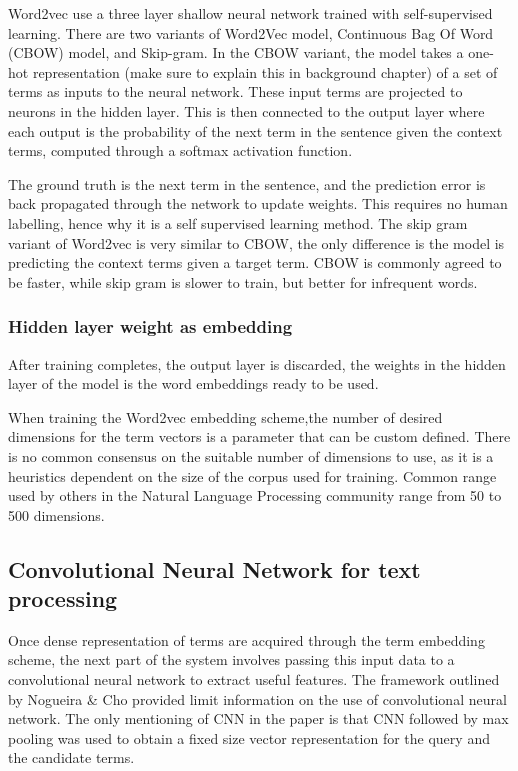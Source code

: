 Word2vec use a three layer shallow neural network trained with self-supervised learning. There are two variants of Word2Vec model, Continuous Bag Of Word (CBOW) model, and Skip-gram. In the CBOW variant, the model takes a one-hot representation (make sure to explain this in background chapter) of a set of terms as inputs to the neural network. These input terms are projected to neurons in the hidden layer. This is then connected to the output layer where each output is the probability of the next term in the sentence given the context terms, computed through a softmax activation function.  



The ground truth is the next term in the sentence, and the prediction error is back propagated through the network to update weights. This requires no human labelling, hence why it is a self supervised learning method. The skip gram variant of Word2vec is very similar to CBOW, the only difference is the model is predicting the context terms given a target term.  CBOW is commonly agreed to be faster, while skip gram is slower to train, but better for infrequent words. 

 
\subsubsection{Hidden layer weight as embedding}

After training completes, the output layer is discarded, the weights in the hidden layer of the model is the word embeddings ready to be used. 

When training the Word2vec embedding scheme,the number of desired dimensions for the term vectors is a parameter that can be custom defined. There is no common consensus on the suitable number of dimensions to use, as it is a heuristics dependent on the size of the corpus used for training. Common range used by others in the Natural Language Processing community range from 50 to 500 dimensions.  







\subsection{Convolutional Neural Network for text processing}

Once dense representation of terms are acquired through the term embedding scheme, the next part of the system involves passing this input data to a convolutional neural network to extract useful features. The framework outlined by Nogueira \& Cho \cite{nogueira2017task} provided limit information on the use of convolutional neural network. The only mentioning of CNN in the paper is that CNN followed by max pooling was used to obtain a fixed size vector representation for the query and the candidate terms. 


